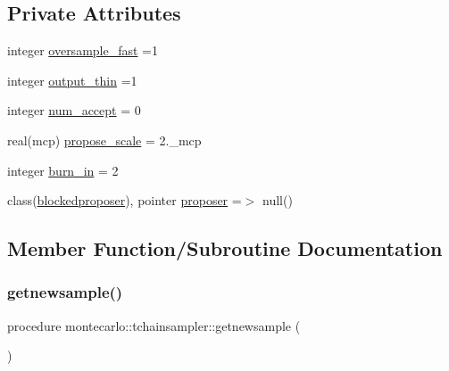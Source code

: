 \subsection*{Private Attributes}
\begin{DoxyCompactItemize}
\item 
integer \mbox{\hyperlink{structmontecarlo_1_1tchainsampler_a5d39cc59841817cec9b00e0299f72d9e}{oversample\+\_\+fast}} =1
\item 
integer \mbox{\hyperlink{structmontecarlo_1_1tchainsampler_aab28c3963cb565088c36b6ca2357515a}{output\+\_\+thin}} =1
\item 
integer \mbox{\hyperlink{structmontecarlo_1_1tchainsampler_ac0905e2e15cdb68268b305dd1071b489}{num\+\_\+accept}} = 0
\item 
real(mcp) \mbox{\hyperlink{structmontecarlo_1_1tchainsampler_a960d9a60918fbba00ce757b21ba3e3fa}{propose\+\_\+scale}} = 2.\+\_\+mcp
\item 
integer \mbox{\hyperlink{structmontecarlo_1_1tchainsampler_a63b77bdd83f41e488dbe4f0f8102bb84}{burn\+\_\+in}} = 2
\item 
class(\mbox{\hyperlink{structpropose_1_1blockedproposer}{blockedproposer}}), pointer \mbox{\hyperlink{structmontecarlo_1_1tchainsampler_a8021f41394264a9a25162b3a7d9b1082}{proposer}} =$>$ null()
\end{DoxyCompactItemize}


\subsection{Member Function/\+Subroutine Documentation}
\mbox{\label{structmontecarlo_1_1tchainsampler_a3edd52a15829b32df264ad24e2dd171c}} 
\subsubsection{\texorpdfstring{getnewsample()}{getnewsample()}}
{\footnotesize\ttfamily procedure montecarlo\+::tchainsampler\+::getnewsample (\begin{DoxyParamCaption}{ }\end{DoxyParamCaption})\hspace{0.3cm}{\ttfamily [private]}}

\mbox{\label{structmontecarlo_1_1tchainsampler_a616c1617aa6842c901afbc82fcfe2222}} 
